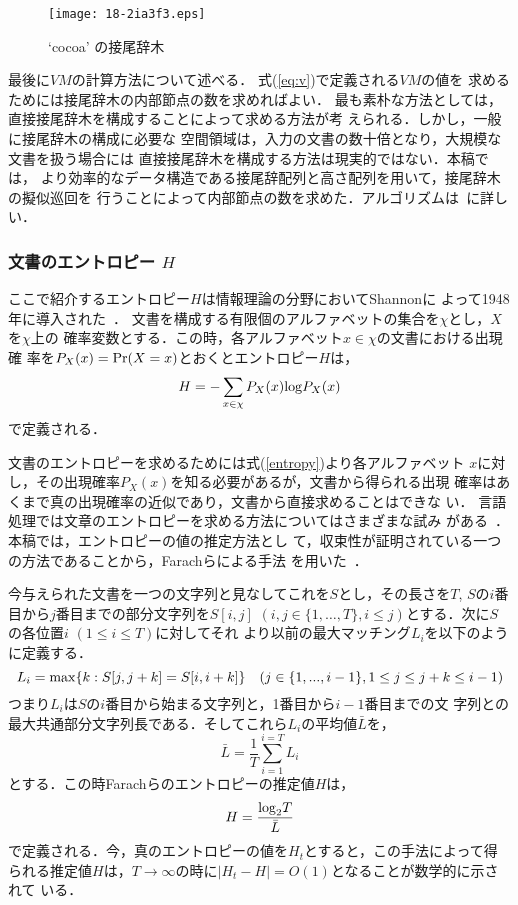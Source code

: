 \documentclass[japanese]{jnlp_JS2.0}
\begin{document}
 \begin{figure}[t]
 \begin{center}
  \texttt{[image: 18-2ia3f3.eps]}
 \end{center}
 \caption{`cocoa' の接尾辞木}
 \label{fig:cocoa}
 \end{figure}
 
最後に$\mathit{VM}$の計算方法について述べる．
式(\ref{eq:v})で定義される$\mathit{VM}$の値を
求めるためには接尾辞木の内部節点の数を求めればよい．
最も素朴な方法としては，直接接尾辞木を構成することによって求める方法が考
えられる．しかし，一般に接尾辞木の構成に必要な
空間領域は，入力の文書の数十倍となり，大規模な文書を扱う場合には
直接接尾辞木を構成する方法は現実的ではない．本稿では，
より効率的なデータ構造である接尾辞配列と高さ配列を用いて，接尾辞木の擬似巡回を
行うことによって内部節点の数を求めた．アルゴリズムは~\cite{Kasai01}に詳しい．


\subsubsection*{文書のエントロピー $H$}

ここで紹介するエントロピー$H$は情報理論の分野においてShannonに
よって1948年に導入された~\cite{Shannon}．
文書を構成する有限個のアルファベットの集合を$\chi$とし，$X$を$\chi$上の
確率変数とする．この時，各アルファベット$x\in \chi$の文書における出現確
率を$P_X(x)={\rm Pr}( X=x )$とおくとエントロピー$H$は，
\begin{equation}
H = -\sum_{x \in \chi}P_X(x){\rm log}P_X(x) 
\label {entropy}
\end{equation}
で定義される．


文書のエントロピーを求めるためには式(\ref{entropy})より各アルファベット
$x$に対し，その出現確率$P_X(x)$を知る必要があるが，文書から得られる出現
確率はあくまで真の出現確率の近似であり，文書から直接求めることはできな
い． 言語処理では文章のエントロピーを求める方法についてはさまざまな試み
がある~\cite{cover,brown}．本稿では，エントロピーの値の推定方法とし
て，収束性が証明されている一つの方法であることから，Farachらによる手法
を用いた~\cite{Farach}．

今与えられた文書を一つの文字列と見なしてこれを$S$とし，その長さを$T$,
$S$の$i$番目から$j$番目までの部分文字列を$S[i,j]$ $(i,j\in\{1,\ldots,T\},
i \leq j)$とする．次に$S$の各位置$i$ $(1 \leq i \leq T)$に対してそれ
より以前の最大マッチング$L_i$を以下のように定義する．
\begin{equation}
L_i={\rm max}\{k: S[j, j+k]=S[i, i+k]\} \quad (j\in\{1,...,i-1\}, 1 \leq j \leq j+k \leq i-1)
\label{eq L}
\end{equation}
つまり$L_i$は$S$の$i$番目から始まる文字列と，1番目から$i-1$番目までの文
字列との最大共通部分文字列長である．そしてこれら$L_i$の平均値$\bar{L}$を，
\[
\bar{L}=\frac{1}{T}\sum_{i=1}^{i=T}L_i
\]
とする．この時Farachらのエントロピーの推定値$H$は，
\begin{equation}
H=\frac{{\rm log}_2T}{\bar{L}}
\end{equation}   
で定義される．今，真のエントロピーの値を$H_t$とすると，この手法によって得
られる推定値$H$は，$T\to\infty$の時に$|H_t-H|=O(1)$となることが数学的に示されて
いる．
\end{document}
